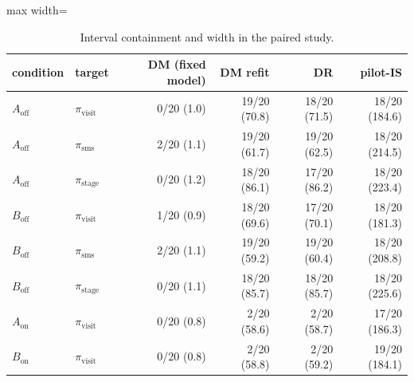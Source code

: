 \begin{table}[!htbp]
\centering
\caption{Interval containment and width in the paired study.}
\label{tab:campaignintervals}
\small
\begin{adjustbox}{max width=\linewidth}
\begin{tabular}{llrrrr}
\toprule
condition & target & DM (fixed model) & DM refit & DR & pilot-IS \\
\midrule
$A_{\mathrm{off}}$ & $\pi_{\mathrm{visit}}$ & 0/20 (1.0) & 19/20 (70.8) & 18/20 (71.5) & 18/20 (184.6) \\
$A_{\mathrm{off}}$ & $\pi_{\mathrm{sms}}$ & 2/20 (1.1) & 19/20 (61.7) & 19/20 (62.5) & 18/20 (214.5) \\
$A_{\mathrm{off}}$ & $\pi_{\mathrm{stage}}$ & 0/20 (1.2) & 18/20 (86.1) & 17/20 (86.2) & 18/20 (223.4) \\
$B_{\mathrm{off}}$ & $\pi_{\mathrm{visit}}$ & 1/20 (0.9) & 18/20 (69.6) & 17/20 (70.1) & 18/20 (181.3) \\
$B_{\mathrm{off}}$ & $\pi_{\mathrm{sms}}$ & 2/20 (1.1) & 19/20 (59.2) & 19/20 (60.4) & 18/20 (208.8) \\
$B_{\mathrm{off}}$ & $\pi_{\mathrm{stage}}$ & 0/20 (1.1) & 18/20 (85.7) & 18/20 (85.7) & 18/20 (225.6) \\
$A_{\mathrm{on}}$ & $\pi_{\mathrm{visit}}$ & 0/20 (0.8) & 2/20 (58.6) & 2/20 (58.7) & 17/20 (186.3) \\
$B_{\mathrm{on}}$ & $\pi_{\mathrm{visit}}$ & 0/20 (0.8) & 2/20 (58.8) & 2/20 (59.2) & 19/20 (184.1) \\
\bottomrule
\end{tabular}
\end{adjustbox}
\end{table}
